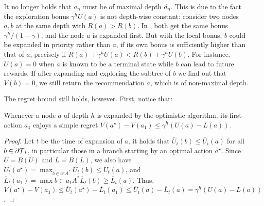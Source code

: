 \begin{remark}
\begin{leftbar}[remarkbar]
It no longer holds that $a_n$ must be of maximal depth $d_n$.  This is due to the fact the exploration bonus $\gamma^h U(a)$ is not depth-wise constant: consider two nodes $a,b$ at the same depth with $R(a) > R(b)$. In \OPD, both get the same bonus $\gamma^h/(1-\gamma)$, and the node $a$ is expanded first. But with the local bonus, $b$ could be expanded in priority rather than $a$, if its own bonus is sufficiently higher than that of $a$, precisely if $R(a)+\gamma^h U(a) < R(b)+\gamma^h U(b)$. For instance, $U(a)=0$ when $a$ is known to be a terminal state while $b$ can lead to future rewards. If after expanding and exploring the subtree of $b$ we find out that $V(b) = 0$, we still return the recommendation $a$, which is of non-maximal depth.
\end{leftbar}
\end{remark}

The regret bound still holds, however. First, notice that:
\begin{lemma}[Expansion]
\begin{leftbar}[lemmabar]
\label{lem:expansion-bound-U}
Whenever a node $a$ of depth $h$ is expanded by the optimistic algorithm, its first action $a_1$ enjoys a simple regret $V(a^\star)-V(a_1) \leq \gamma^h(U(a)-L(a))$. 
\end{leftbar}
\end{lemma}
\begin{proof}
Let $t$ be the time of expansion of $a$, it holds that $\overline{U}_t(b) \leq \overline{U}_t(a)$ for all $b\in {\partial \mathcal{T}}_t$, in particular those in a branch starting by an optimal action $a^\star$. Since $U=B(U)$ and $L=B(L)$, we also have $\overline{U}_t(a^\star) = \max_{b\in a^\star A^*} \overline{U}_t(b) \leq \overline{U}_t(a)$, and $\overline{L}_t(a_1) = \max{b\in a_1 A^*} \overline{L}_t(b) \geq  \overline{L}_t(a)$. Thus, $V(a^\star)-V(a_1) \leq \overline{U}_t(a^\star) - \overline{L}_t(a_1) \leq \overline{U}_t(a) - \overline{L}_t(a) = \gamma^h(U(a)-L(a))$.
\end{proof}
 
